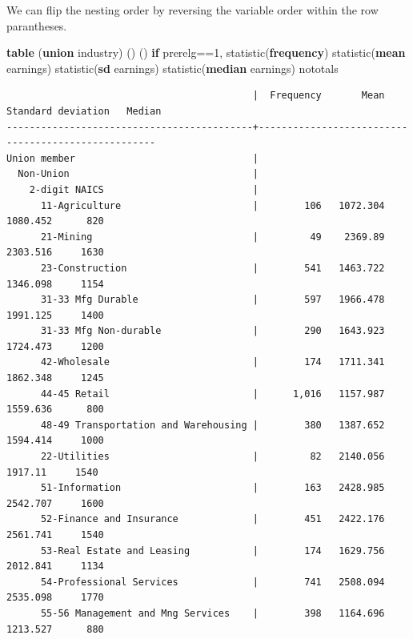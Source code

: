 \documentclass[
]{book}
\newenvironment{Shaded}{\begin{snugshade}}{\end{snugshade}}
\newcommand{\FunctionTok}[1]{\textcolor[rgb]{0.13,0.29,0.53}{\textbf{#1}}}
\newcommand{\KeywordTok}[1]{\textcolor[rgb]{0.13,0.29,0.53}{\textbf{#1}}}
\newcommand{\NormalTok}[1]{#1}
\begin{document}
We can flip the nesting order by reversing the variable order within the row parantheses.

\begin{Shaded}
\begin{Highlighting}[]
\KeywordTok{table}\NormalTok{ (}\KeywordTok{union}\NormalTok{ industry) () () }\KeywordTok{if}\NormalTok{ prerelg==1, statistic(}\KeywordTok{frequency}\NormalTok{) statistic(}\KeywordTok{mean}\NormalTok{ earnings) statistic(}\FunctionTok{sd}\NormalTok{ earnings) statistic(}\KeywordTok{median}\NormalTok{ earnings) nototals}
\end{Highlighting}
\end{Shaded}

\begin{verbatim}
                                           |  Frequency       Mean   Standard deviation   Median
-------------------------------------------+----------------------------------------------------
Union member                               |                                                    
  Non-Union                                |                                                    
    2-digit NAICS                          |                                                    
      11-Agriculture                       |        106   1072.304             1080.452      820
      21-Mining                            |         49    2369.89             2303.516     1630
      23-Construction                      |        541   1463.722             1346.098     1154
      31-33 Mfg Durable                    |        597   1966.478             1991.125     1400
      31-33 Mfg Non-durable                |        290   1643.923             1724.473     1200
      42-Wholesale                         |        174   1711.341             1862.348     1245
      44-45 Retail                         |      1,016   1157.987             1559.636      800
      48-49 Transportation and Warehousing |        380   1387.652             1594.414     1000
      22-Utilities                         |         82   2140.056              1917.11     1540
      51-Information                       |        163   2428.985             2542.707     1600
      52-Finance and Insurance             |        451   2422.176             2561.741     1540
      53-Real Estate and Leasing           |        174   1629.756             2012.841     1134
      54-Professional Services             |        741   2508.094             2535.098     1770
      55-56 Management and Mng Services    |        398   1164.696             1213.527      880

\end{verbatim}
\end{document}
